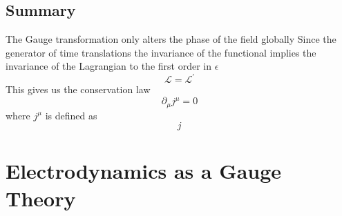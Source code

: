 \subsection{Summary}
The Gauge transformation only alters the phase of the field globally
Since the generator of time translations the invariance of the functional implies the invariance of the Lagrangian to the first order in $\epsilon$
\begin{equation}
    \mathcal{L} = \mathcal{L}^{'}
\end{equation}
This gives us the conservation law
\begin{equation}
 \partial_{\mu} j^{\mu} = 0
\end{equation}
where $j^{\mu}$ is defined as
\begin{equation}
    j^{}
\end{equation}
\section{Electrodynamics as a Gauge Theory}

